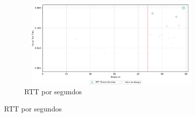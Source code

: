 \begin{apendicesenv}
\begin{figure}[htbp!]
\begin{subfigure}[t]{0.5\textwidth}
    \end{subfigure}%
    ~
    \begin{subfigure}[t]{0.5\textwidth}
        \centering
        \caption{RTT por segundos}
        \includegraphics[width=1\textwidth, height=120pt]{USPSC-img/output/cropped/2-dos_hping3-rtts.png}
    \end{subfigure}%
\end{figure}


\end{apendicesenv}
